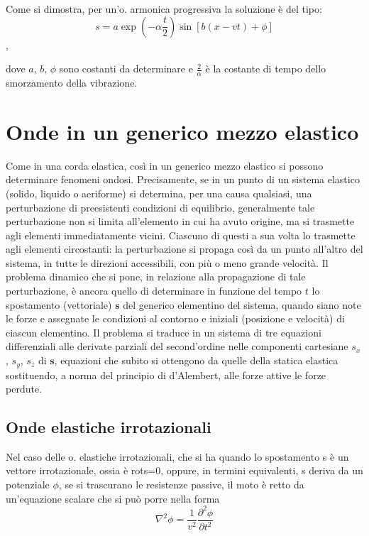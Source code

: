 \documentclass[a4paper]{article}
\begin{document}
Come si dimostra, per un'o. armonica progressiva la soluzione è del tipo:
\begin{equation}
s = a \exp(- \alpha \frac{t}{2})\sin[b (x - vt) +\phi]
\end{equation},

dove $a$, $b$, $\phi$ sono costanti da determinare e $\frac{2}{\alpha}$ è la costante di tempo dello smorzamento della vibrazione. 

\section{Onde in un generico mezzo elastico}
Come in una corda elastica, così in un generico mezzo elastico si possono determinare fenomeni ondosi. Precisamente, se in un punto di un sistema elastico (solido, liquido o aeriforme) si determina, per una causa qualsiasi, una perturbazione di preesistenti condizioni di equilibrio, generalmente tale perturbazione non si limita all'elemento in cui ha avuto origine, ma si trasmette agli elementi immediatamente vicini. Ciascuno di questi a sua volta lo trasmette agli elementi circostanti: la perturbazione si propaga così da un punto all'altro del sistema, in tutte le direzioni accessibili, con più o meno grande velocità. Il problema dinamico che si pone, in relazione alla propagazione di tale perturbazione, è ancora quello di determinare in funzione del tempo $t$ lo spostamento (vettoriale) $\mathbf{s}$ del generico elementino del sistema, quando siano note le forze e assegnate le condizioni al contorno e iniziali (posizione e velocità) di ciascun elementino. Il problema si traduce in un sistema di tre equazioni differenziali alle derivate parziali del second'ordine nelle componenti cartesiane $s_x$, $s_y$, $s_z$ di $\mathbf{s}$, equazioni che subito si ottengono da quelle della statica elastica sostituendo, a norma del principio di d'Alembert, alle forze attive le forze perdute.

\subsection{Onde elastiche irrotazionali}
Nel caso delle o. elastiche irrotazionali, che si ha quando lo spostamento s è un vettore irrotazionale, ossia è rots=0, oppure, in termini equivalenti, s deriva da un potenziale $\phi$, se si trascurano le resistenze passive, il moto è retto da un'equazione scalare che si può porre nella forma 
\begin{equation}
\nabla^2\phi=\frac{1}{v^2}\frac{\partial^2 \phi}{\partial t^2}
\end{equation}
\end{document}
